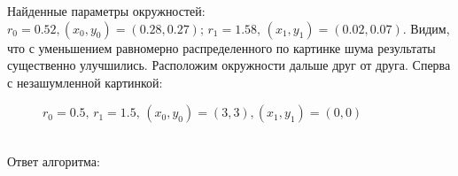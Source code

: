 \documentclass[12pt,twoside]{article}
\begin{document}
Найденные параметры окружностей: $r_0 = 0.52, (x_0, y_0) = (0.28, 0.27); \, r_1 = 1.58, \, (x_1, y_1) = (0.02, 0.07)$. Видим, что с уменьшением равномерно распределенного по картинке шума результаты существенно улучшились. \newpage 
Расположим окружности дальше друг от друга. Сперва с незашумленной картинкой: \\
\begin{figure}[h]
\caption{$r_0 = 0.5, \, r_1 = 1.5, \, (x_0, y_0) = (3, 3), (x_1, y_1) = (0, 0)$}
\end{figure} \\
Ответ алгоритма: \\
\begin{figure}[h]
\end{figure}\\
\end{document}
